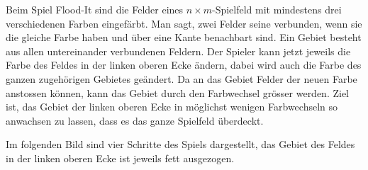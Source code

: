 Beim Spiel Flood-It sind die Felder eines $n\times m$-Spielfeld mit 
mindestens drei verschiedenen Farben eingefärbt.
Man sagt, zwei Felder seine verbunden, wenn sie die gleiche Farbe
haben und über eine Kante benachbart sind.
Ein Gebiet besteht aus allen untereinander verbundenen Feldern.
Der Spieler kann jetzt jeweils die Farbe des Feldes in der linken
oberen Ecke ändern, dabei wird auch die Farbe des ganzen zugehörigen
Gebietes geändert.
Da an das Gebiet Felder der neuen Farbe anstossen können, kann das
Gebiet durch den Farbwechsel grösser werden.
Ziel ist, das Gebiet der linken oberen Ecke in möglichst wenigen
Farbwechseln so anwachsen zu lassen, dass es das ganze Spielfeld überdeckt.

Im folgenden Bild sind vier Schritte des Spiels dargestellt, das Gebiet
des Feldes in der linken oberen Ecke ist jeweils fett ausgezogen.
